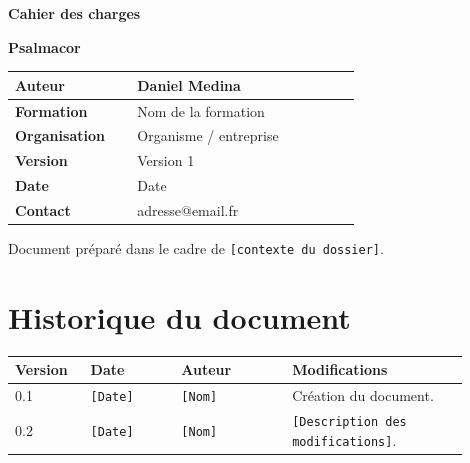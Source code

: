\documentclass[11pt,a4paper]{report}
\makeatletter
\newcommand{\documenttype}{Cahier des charges}
\newcommand{\projectname}{Psalmacor}
\newcommand{\authorname}{Daniel Medina}
\newcommand{\formationname}{Nom de la formation}
\newcommand{\organizationname}{Organisme / entreprise}
\newcommand{\versionnumber}{Version 1}
\newcommand{\documentdate}{Date}
\newcommand{\contactemail}{adresse@email.fr}
\newcommand{\placeholder}[1]{\textcolor{placeholderColor}{\texttt{[#1]}}}
\newenvironment{keyvaluetable}{%
  \begin{tabular}{>{\bfseries}p{0.30\linewidth}p{0.55\linewidth}}
}{%
  \end{tabular}
}
\newcommand{\kvrow}[2]{#1 & #2 \\\midrule}
\makeatother
\begin{document}
\begin{titlepage}
  \centering
  \vspace*{2cm}

  {\Huge\bfseries \documenttype \par}
  \vspace{1cm}
  {\LARGE\bfseries \projectname \par}

  \vfill

  \begin{tcolorbox}[colback=softgray,colframe=lightborder,width=0.85\linewidth]
    \begin{keyvaluetable}
      \kvrow{Auteur}{\authorname}
      \kvrow{Formation}{\formationname}
      \kvrow{Organisation}{\organizationname}
      \kvrow{Version}{\versionnumber}
      \kvrow{Date}{\documentdate}
      \kvrow{Contact}{\contactemail}
    \end{keyvaluetable}
  \end{tcolorbox}

  \vfill
  {\small Document préparé dans le cadre de \placeholder{contexte du dossier}.}
\end{titlepage}

\chapter*{Historique du document}

\begin{longtable}{p{0.15\linewidth}p{0.18\linewidth}p{0.22\linewidth}p{0.35\linewidth}}
\toprule
\textbf{Version} & \textbf{Date} & \textbf{Auteur} & \textbf{Modifications} \\
\midrule
\endhead
0.1 & \placeholder{Date} & \placeholder{Nom} & Création du document. \\
0.2 & \placeholder{Date} & \placeholder{Nom} & \placeholder{Description des modifications}. \\
\bottomrule
\end{longtable}

\newpage
\tableofcontents
\newpage
\listoffigures
\newpage
\listoftables
\newpage
\end{document}
